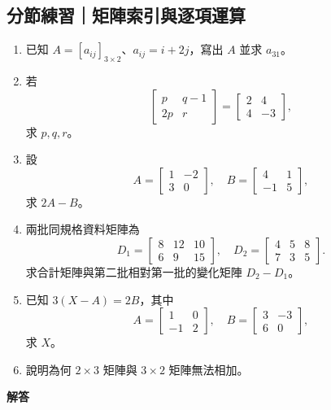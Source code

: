 \documentclass[11pt,a4paper]{article}
\providecommand{\tightlist}{%
  \setlength{\itemsep}{0pt}\setlength{\parskip}{0pt}}
\begin{document}
\begin{HandoutSelfCheck}

\subsection{分節練習｜矩陣索引與逐項運算}\label{ux5206ux7bc0ux7df4ux7fd2ux77e9ux9663ux7d22ux5f15ux8207ux9010ux9805ux904bux7b97}

\begin{enumerate}
\def\labelenumi{\arabic{enumi}.}
\tightlist
\item
  已知 \(A=[a_{ij}]_{3\times2}\)、\(a_{ij}=i+2j\)，寫出 \(A\) 並求 \(a_{31}\)。
\item
  若
  \[
  \begin{bmatrix}p&q-1\\2p&r\end{bmatrix}
  =
  \begin{bmatrix}2&4\\4&-3\end{bmatrix},
  \]
  求 \(p,q,r\)。
\item
  設
  \[
  A=\begin{bmatrix}1&-2\\3&0\end{bmatrix},
  \quad
  B=\begin{bmatrix}4&1\\-1&5\end{bmatrix},
  \]
  求 \(2A-B\)。
\item
  兩批同規格資料矩陣為
  \[
  D_1=\begin{bmatrix}8&12&10\\6&9&15\end{bmatrix},
  \quad
  D_2=\begin{bmatrix}4&5&8\\7&3&5\end{bmatrix}.
  \]
  求合計矩陣與第二批相對第一批的變化矩陣 \(D_2-D_1\)。
\item
  已知 \(3(X-A)=2B\)，其中
  \[
  A=\begin{bmatrix}1&0\\-1&2\end{bmatrix},
  \quad
  B=\begin{bmatrix}3&-3\\6&0\end{bmatrix},
  \]
  求 \(X\)。
\item
  說明為何 \(2\times3\) 矩陣與 \(3\times2\) 矩陣無法相加。
\end{enumerate}

\textbf{解答}


\end{HandoutSelfCheck}
\end{document}
